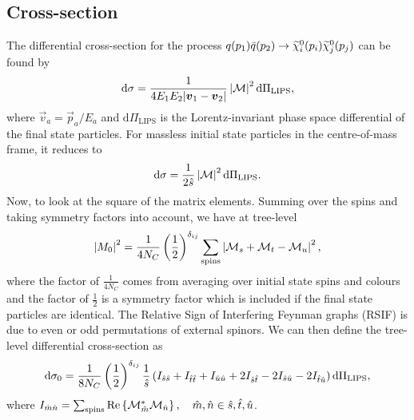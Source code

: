 \documentclass[english,notitlepage]{article}
\begin{document}
\subsection{Cross-section}
    The differential cross-section for the process \(q(p_1)\bar{q}(p_2) \to \nino[i](p_i) \nino[j](p_j)\) can be found by
    \begin{equation}
        \mathrm{d}\sigma = \frac{1}{4E_1E_2|\vec{v}_1 - \vec{v}_2|} \abs{\M}^2 \mathrm{d}\Pi_\text{LIPS},
    \end{equation}
    where \(\vec{v}_a = \vec{p}_a / E_a\) and \(\mathrm{d}\Pi_\text{LIPS}\) is the Lorentz-invariant phase space differential of the final state particles.
    For massless initial state particles in the centre-of-mass frame, it
    reduces to
    \begin{equation}
        \mathrm{d}\sigma = \frac{1}{2\hat{s}} \abs{\M}^2 \mathrm{d}\Pi_\text{LIPS}.
    \end{equation}
    Now, to look at the square of the matrix elements.
    Summing over the spins and taking symmetry factors into account, we have at tree-level
    \begin{align}
        \abs{M_0}^2 = \frac{1}{4 N_C} \pclosed{\frac{1}{2}}^{\delta_{ij}} \sum_\text{spins} \abs{\M_s + \M_t - \M_u}^2,
    \end{align}
    where the factor of \(\frac{1}{4N_C}\) comes from averaging over initial state spins and colours and the factor of \(\frac{1}{2}\) is a symmetry factor which is included if the final state particles are identical.
    The Relative Sign of Interfering Feynman graphs (RSIF) is due to even or odd permutations of external spinors.
    We can then define the tree-level differential cross-section as
    \begin{equation}
        \label{eq:dsigma}
        \mathrm{d}\sigma_0 = \frac{1}{8N_C} \pclosed{\frac{1}{2}}^{\delta_{ij}} \frac{1}{\hat{s}} \pclosed{I_{\hat{s}\hat{s}} + I_{\hat{t}\hat{t}} + I_{\hat{u}\hat{u}} + 2I_{\hat{s}\hat{t}} - 2I_{\hat{s}\hat{u}} - 2I_{\hat{t}\hat{u}}} \mathrm{d}\Pi_\text{LIPS},
    \end{equation}
    where \(I_{\hat{m}\hat{n}} = \sum_{\text{spins}} \Re{\M_{\hat{m}}^\ast \M_{\hat{n}}}, \quad \hat{m}, \hat{n} \in \hat{s}, \hat{t}, \hat{u}\).
\end{document}
